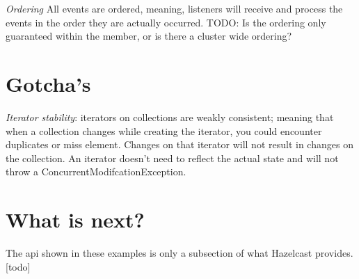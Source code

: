 \emph{Ordering} All events are ordered, meaning, listeners will receive and process the events in the order they are actually occurred. TODO: Is the ordering only guaranteed within the member, or is there a cluster wide ordering?

\section{Gotcha's}

\emph{Iterator stability}: iterators on collections are weakly consistent; meaning that when a collection changes while creating the iterator, you could encounter duplicates or miss element. Changes on that iterator will not result in changes on the collection. An iterator doesn't need to reflect the actual state and will not throw a ConcurrentModifcationException. 

\section{What is next?}
The api shown in these examples is only a subsection of what Hazelcast provides.[todo]